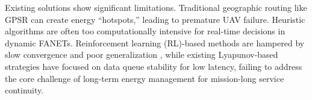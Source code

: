 \documentclass[runningheads]{llncs}
\begin{document}

Existing solutions show significant limitations. Traditional geographic routing like GPSR \cite{gpsr} can create energy ``hotspots,'' leading to premature UAV failure. Heuristic algorithms \cite{intro12,aco} are often too computationally intensive for real-time decisions in dynamic FANETs. Reinforcement learning (RL)-based methods \cite{qtar,DRLFR,DRLRR} are hampered by slow convergence and poor generalization , while existing Lyapunov-based strategies \cite{intro13,intro9} have focused on data queue stability for low latency, failing to address the core challenge of long-term energy management for mission-long service continuity.
\end{document}
